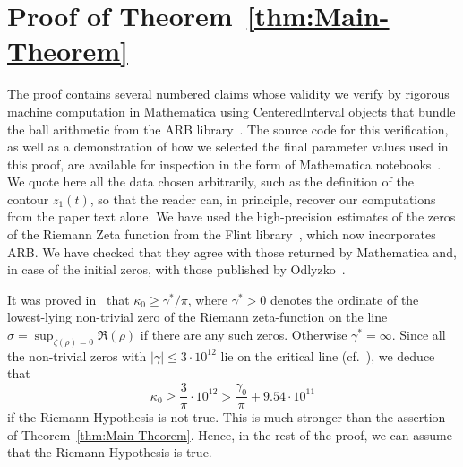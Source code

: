 \documentclass[oneside,english]{amsart}
\numberwithin{equation}{section}
\numberwithin{figure}{section}
\theoremstyle{plain}
\theoremstyle{plain}
\theoremstyle{plain}
\theoremstyle{definition}
\begin{document}
\section{Proof of Theorem~\ref{thm:Main-Theorem}\label{sec:Proof}}

The proof contains several numbered claims whose validity we verify
by rigorous machine computation in Mathematica using CenteredInterval
objects that bundle the ball arithmetic from the ARB library~\cite{ARB}.
The source code for this verification, as well as a demonstration
of how we selected the final parameter values used in this proof,
are available for inspection in the form of Mathematica notebooks~\cite{GKPR}.
We quote here all the data chosen arbitrarily, such as the definition
of the contour $z_{1}(t)$, so that the reader can, in principle,
recover our computations from the paper text alone. We have used the
high-precision estimates of the zeros of the Riemann Zeta function
from the Flint library~\cite{FLINT}, which now incorporates ARB.
We have checked that they agree with those returned by Mathematica
and, in case of the initial zeros, with those published by Odlyzko~\cite{Odlyzko}.

It was proved in~\cite[Theorem 2]{Kaczorowski1985} that $\kappa_{0}\geq\gamma^{*}/\pi$,
where $\gamma^{*}>0$ denotes the ordinate of the lowest-lying non-trivial
zero of the Riemann zeta-function on the line $\sigma=\sup_{\zeta(\rho)=0}\Re(\rho)$
if there are any such zeros. Otherwise $\gamma^{*}=\infty$. Since
all the non-trivial zeros with $|\gamma|\leq3\cdot10^{12}$ lie on
the critical line (cf.~\cite{PlattTrudgian2021}), we deduce that
\[
\kappa_{0}\geq\frac{3}{\pi}\cdot10^{12}>\frac{\gamma_{0}}{\pi}+9.54\cdot10^{11}
\]
if the Riemann Hypothesis is not true. This is much stronger than
the assertion of Theorem~\ref{thm:Main-Theorem}. Hence, in the rest
of the proof, we can assume that the Riemann Hypothesis is true. 
\end{document}
